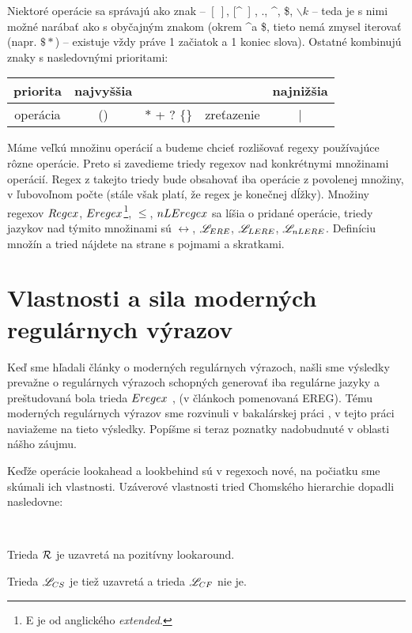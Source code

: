 Niektoré operácie sa správajú ako znak -- $\left[~\right]$, [\textasciicircum~] , ., \textasciicircum, \$, $\backslash k$ -- teda je s nimi možné narábať ako s obyčajným znakom (okrem \textasciicircum a \$, tieto nemá zmysel iterovať (napr. $\$*$) -- existuje vždy práve 1 začiatok a 1 koniec slova). Ostatné kombinujú znaky s nasledovnými prioritami:
\begin{center}
\begin{tabular}{|c||c|c|c|c|}
\hline
priorita &najvyššia&&& najnižšia  \\
\hline
operácia & () & $*$ + ? $\lbrace \rbrace$ & zreťazenie & | \\ \hline
\end{tabular}
\end{center}

Máme veľkú množinu operácií a budeme chcieť rozlišovať regexy používajúce rôzne operácie. Preto si zavedieme triedy regexov nad konkrétnymi množinami operácií. Regex z takejto triedy bude obsahovať iba operácie z povolenej množiny, v ľubovoľnom počte (stále však platí, že regex je konečnej dĺžky). Množiny regexov $Regex$, $Eregex$\footnote{E je od anglického \textit{extended}.}, $\le$, $nLEregex$ sa líšia o pridané operácie, triedy jazykov nad týmito množinami sú $\rel$, $\mathscr{L}_{ERE}$, $\mathscr{L}_{LERE}$, $\mathscr{L}_{nLERE}$. Definíciu množín a tried nájdete na strane s pojmami a skratkami.

\section[Vlastnosti a sila]{Vlastnosti a sila moderných regulárnych výrazov}
\label{usila}

Keď sme hľadali články o moderných regulárnych výrazoch, našli sme výsledky prevažne o regulárnych výrazoch schopných generovať iba regulárne jazyky a preštudovaná bola trieda $Eregex$ \cite{ExtendedRegexPower}, \cite{ExtendedRegexIntersec} (v článkoch pomenovaná EREG). Tému moderných regulárnych výrazov sme rozvinuli v bakalárskej práci \cite{mojaBak}, v tejto práci naviažeme na tieto výsledky. Popíšme si teraz poznatky nadobudnuté v oblasti nášho záujmu.

Keďže operácie lookahead a lookbehind sú v regexoch nové, na počiatku sme skúmali ich vlastnosti. Uzáverové vlastnosti tried Chomského hierarchie dopadli nasledovne:
\begin{veta} \textbf{\emph{\cite[Veta 2.2.5.]{mojaBak}}}\label{lookaround+R} \ \par
Trieda ${\cal R}$ je uzavretá na pozitívny lookaround.
\end{veta}
Trieda $\mathscr{L}_{CS}$ je tiež uzavretá a trieda $\mathscr{L}_{CF}$ nie je.

